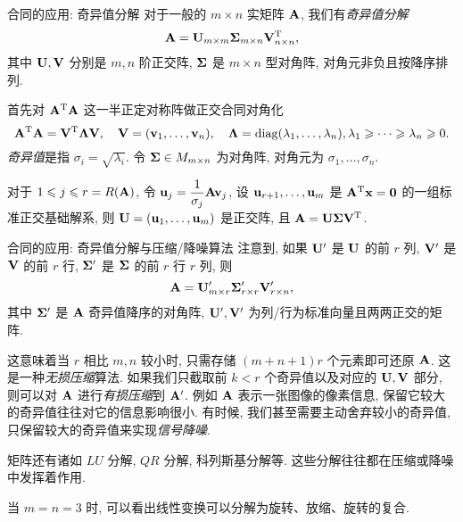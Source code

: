 \begin{frame}{合同的应用: 奇异值分解\noexer}
	\onslide<+->
	对于一般的 $m\times n$ 实矩阵 ${\mathbf{A}}$, 我们有\emph{奇异值分解}
	\[{\mathbf{A}}={\mathbf{U}}_{m\times m}{\boldsymbol{\Sigma}}_{m\times n}{\mathbf{V}}^{\mathrm{T}}_{n\times n},\]
	其中 ${\mathbf{U}},{\mathbf{V}}$ 分别是 $m,n$ 阶正交阵, ${\boldsymbol{\Sigma}}$ 是 $m\times n$ 型对角阵, 对角元非负且按降序排列.

	\onslide<+->
	首先对 ${\mathbf{A}}^{\mathrm{T}}{\mathbf{A}}$ 这一半正定对称阵做正交合同对角化
	\[{\mathbf{A}}^{\mathrm{T}}{\mathbf{A}}={\mathbf{V}}^{\mathrm{T}}{\boldsymbol{\Lambda}}{\mathbf{V}},\quad
	{\mathbf{V}}=({\mathbf{v}}_1,\dots,{\mathbf{v}}_n),\quad
	{\boldsymbol{\Lambda}}={\mathrm{diag}}(\lambda_1,\dots,\lambda_n),\lambda_1\geqslant\cdots\geqslant\lambda_n\geqslant0.\]
	\onslide<+->
	\emph{奇异值}是指 $\sigma_i=\sqrt{\lambda_i}$.
	\onslide<+->
	令 ${\boldsymbol{\Sigma}}\in M_{m\times n}$ 为对角阵, 对角元为 $\sigma_1,\dots,\sigma_n$.

	\onslide<+->
	对于 $1\leqslant j\leqslant r=R({\mathbf{A}})$, 令 ${\mathbf{u}}_j=\dfrac1{\sigma_j}{\mathbf{A}} {\mathbf{v}}_j$, 
	\onslide<+->
	设 ${\mathbf{u}}_{r+1},\dots,{\mathbf{u}}_m$ 是 ${\mathbf{A}}^{\mathrm{T}}{\mathbf{x}}={\bf0}$ 的一组标准正交基础解系,
	\onslide<+->
	则 ${\mathbf{U}}=({\mathbf{u}}_1,\dots,{\mathbf{u}}_m)$ 是正交阵, 且 ${\mathbf{A}}={\mathbf{U}}{\boldsymbol{\Sigma}}{\mathbf{V}}^{\mathrm{T}}$.
\end{frame}



\begin{frame}{合同的应用: 奇异值分解与压缩/降噪算法\noexer}
	\onslide<+->
	注意到, 如果 ${\mathbf{U}}'$ 是 ${\mathbf{U}}$ 的前 $r$ 列, ${\mathbf{V}}'$ 是 ${\mathbf{V}}$ 的前 $r$ 行, ${\boldsymbol{\Sigma}}'$ 是 ${\boldsymbol{\Sigma}}$ 的前 $r$ 行 $r$ 列,
	\onslide<+->
	则
	\[{\mathbf{A}}={\mathbf{U}}'_{m\times r}{\boldsymbol{\Sigma}}'_{r\times r}{\mathbf{V}}'_{r\times n},\]
	其中 ${\boldsymbol{\Sigma}}'$ 是 ${\mathbf{A}}$ 奇异值降序的对角阵, ${\mathbf{U}}',{\mathbf{V}}'$ 为列/行为标准向量且两两正交的矩阵.

	\onslide<+->
	这意味着当 $r$ 相比 $m,n$ 较小时, 只需存储 $(m+n+1)r$ 个元素即可还原 ${\mathbf{A}}$.
	\onslide<+->
	这是一种\emph{无损压缩}算法.
	\onslide<+->
	如果我们只截取前 $k<r$ 个奇异值以及对应的 ${\mathbf{U}},{\mathbf{V}}$ 部分, 则可以对 ${\mathbf{A}}$ 进行\emph{有损压缩}到 ${\mathbf{A}}'$.
	\onslide<+->
	例如 ${\mathbf{A}}$ 表示一张图像的像素信息, 保留它较大的奇异值往往对它的信息影响很小.
	\onslide<+->
	有时候, 我们甚至需要主动舍弃较小的奇异值, 只保留较大的奇异值来实现\emph{信号降噪}.

	\onslide<+->
	矩阵还有诸如 $LU$ 分解, $QR$ 分解, 科列斯基分解等.
	这些分解往往都在压缩或降噪中发挥着作用.

	\onslide<+->
	当 $m=n=3$ 时, 可以看出线性变换可以分解为旋转、放缩、旋转的复合.
\end{frame}
